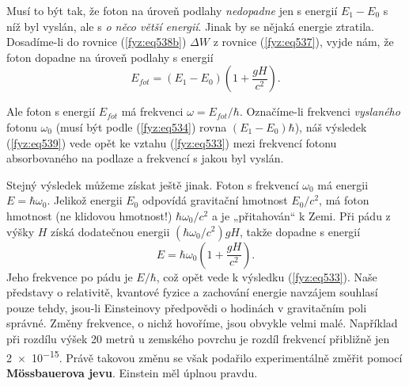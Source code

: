     Musí to být tak, že foton na úroveň podlahy \emph{nedopadne} jen s energií \(E_1 - E_0\) s níž 
    byl vyslán, ale s \emph{o něco větší energií}. Jinak by se nějaká energie ztratila. Dosadíme-li 
    do rovnice (\ref{fyz:eq538b}) \(\Delta W\) z rovnice (\ref{fyz:eq537}), vyjde nám, že foton 
    dopadne na úroveň podlahy s energií
    \begin{equation}\label{fyz:eq539}
      E_{fot} = (E_1-E_0)\left(1 + \dfrac{gH}{c^2}\right).
    \end{equation}
    
    Ale foton s energií \(E_{fot}\) má frekvenci \(\omega = E_{fot}/\hbar\). Označíme-li frekvenci 
    \emph{vyslaného} fotonu \(\omega_0\) (musí být podle (\ref{fyz:eq534}) rovna \((E_1 - 
    E_0)\hbar\)), náš výsledek (\ref{fyz:eq539}) vede opět ke vztahu (\ref{fyz:eq533}) mezi 
    frekvencí fotonu absorbovaného na podlaze a frekvencí s jakou byl vyslán.
    
    Stejný výsledek můžeme získat ještě jinak. Foton s frekvencí \(\omega_0\) má energii \(E = 
    \hbar\omega_0\). Jelikož energii \(E_0\) odpovídá gravitační hmotnost \(E_0/c^2\), má foton 
    hmotnost (ne klidovou hmotnost!) \(\hbar\omega_0/c^2\) a je „přitahován“ k Zemi. Při pádu z 
    výšky \(H\) získá  dodatečnou energii \((\hbar\omega_0/c^2)gH\), takže dopadne s energií
    \begin{equation*}
      E = \hbar\omega_0\left(1 + \dfrac{gH}{c^2}\right).
    \end{equation*}
    Jeho frekvence po pádu je \(E/\hbar\), což opět vede k výsledku (\ref{fyz:eq533}). Naše 
    představy o relativitě, kvantové fyzice a zachování energie navzájem souhlasí pouze tehdy, 
    jsou-li Einsteinovy předpovědi o hodinách v gravitačním poli správné. Změny frekvence, o nichž 
    hovoříme, jsou obvykle velmi malé. Například při rozdílu výšek \num{20} metrů u zemského 
    povrchu je rozdíl frekvencí přibližně jen \num{2e-15}. Právě takovou změnu se však podařilo 
    experimentálně změřit pomocí \textbf{Mössbauerova jevu}. Einstein měl úplnou pravdu.
    
